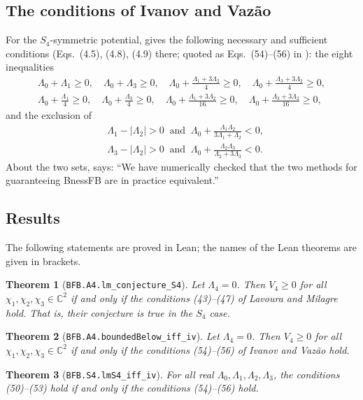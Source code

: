 \documentclass[11pt,a4paper]{amsart}
\newtheorem{theorem}{Theorem}
\theoremstyle{remark}
\newcommand{\C}{\mathbb{C}}
\newcommand{\La}{\Lambda}
\newcommand{\lean}[1]{\texttt{#1}}
\begin{document}
\subsection*{The conditions of Ivanov and Vaz\~ao}
For the $S_4$-symmetric potential, \cite{IV} gives the following necessary and sufficient conditions (Eqs.~(4.5),
(4.8), (4.9) there; quoted as Eqs.~(54)--(56) in \cite{LM}): the eight inequalities
\begin{equation}\tag{54}
\begin{gathered}
\La_0+\La_1\ge0,\quad \La_0+\La_3\ge0,\quad \La_0+\frac{\La_1+3\La_2}{4}\ge0,\quad \La_0+\frac{\La_3+3\La_2}{4}\ge0,\\
\La_0+\frac{\La_1}{4}\ge0,\quad \La_0+\frac{\La_3}{4}\ge0,\quad \La_0+\frac{\La_1+3\La_2}{16}\ge0,\quad
\La_0+\frac{\La_3+3\La_2}{16}\ge0,
\end{gathered}
\end{equation}
and the exclusion of
\begin{align}
&\La_1-|\La_2|>0 \ \text{ and }\ \La_0+\frac{\La_1\La_2}{3\La_1+\La_2}<0,\tag{55}\\
&\La_3-|\La_2|>0 \ \text{ and }\ \La_0+\frac{\La_2\La_3}{\La_2+3\La_3}<0.\tag{56}
\end{align}
About the two sets, \cite{LM} says: ``We have numerically checked that the two methods for guaranteeing BnessFB
are in practice equivalent.''

\subsection*{Results}
The following statements are proved in Lean; the names of the Lean theorems are given in brackets.

\begin{theorem}[\lean{BFB.A4.lm\_conjecture\_S4}]\label{thm:main}
Let $\La_4=0$. Then $V_4\ge0$ for all $\chi_1,\chi_2,\chi_3\in\C^2$ if and only if the conditions
\textup{(43)--(47)} of Lavoura and Milagre hold. That is, their conjecture is true in the $S_4$ case.
\end{theorem}

\begin{theorem}[\lean{BFB.A4.boundedBelow\_iff\_iv}]\label{thm:iv}
Let $\La_4=0$. Then $V_4\ge0$ for all $\chi_1,\chi_2,\chi_3\in\C^2$ if and only if the conditions
\textup{(54)--(56)} of Ivanov and Vaz\~ao hold.
\end{theorem}

\begin{theorem}[\lean{BFB.S4.lmS4\_iff\_iv}]\label{thm:equiv}
For all real $\La_0,\La_1,\La_2,\La_3$, the conditions \textup{(50)--(53)} hold if and only if the conditions
\textup{(54)--(56)} hold.
\end{theorem}
\end{document}
